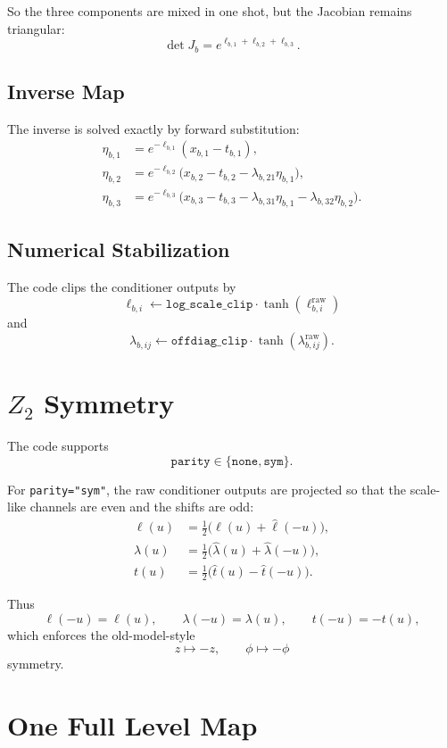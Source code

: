 \documentclass[11pt]{article}
\begin{document}
So the three components are mixed in one shot, but the Jacobian remains
triangular:
\[
\det J_b = e^{\ell_{b,1}+\ell_{b,2}+\ell_{b,3}}.
\]

\subsection{Inverse Map}

The inverse is solved exactly by forward substitution:
\begin{align}
\eta_{b,1} &= e^{-\ell_{b,1}}(x_{b,1}-t_{b,1}), \\
\eta_{b,2} &= e^{-\ell_{b,2}}
\bigl(x_{b,2}-t_{b,2}-\lambda_{b,21}\eta_{b,1}\bigr), \\
\eta_{b,3} &= e^{-\ell_{b,3}}
\bigl(x_{b,3}-t_{b,3}-\lambda_{b,31}\eta_{b,1}-\lambda_{b,32}\eta_{b,2}\bigr).
\end{align}

\subsection{Numerical Stabilization}

The code clips the conditioner outputs by
\[
\ell_{b,i}\leftarrow
\texttt{log\_scale\_clip}\cdot \tanh(\ell_{b,i}^{\mathrm{raw}})
\]
and
\[
\lambda_{b,ij}\leftarrow
\texttt{offdiag\_clip}\cdot \tanh(\lambda_{b,ij}^{\mathrm{raw}}).
\]

\section{$Z_2$ Symmetry}

The code supports
\[
\texttt{parity}\in\{\texttt{none},\texttt{sym}\}.
\]

For \texttt{parity="sym"}, the raw conditioner outputs are projected so that
the scale-like channels are even and the shifts are odd:
\begin{align}
\ell(u) &= \frac12\bigl(\hat \ell(u) + \hat \ell(-u)\bigr), \\
\lambda(u) &= \frac12\bigl(\hat \lambda(u) + \hat \lambda(-u)\bigr), \\
t(u) &= \frac12\bigl(\hat t(u) - \hat t(-u)\bigr).
\end{align}

Thus
\[
\ell(-u)=\ell(u),\qquad
\lambda(-u)=\lambda(u),\qquad
t(-u)=-t(u),
\]
which enforces the old-model-style
\[
z\mapsto -z,\qquad \phi\mapsto -\phi
\]
symmetry.

\section{One Full Level Map}
\end{document}
